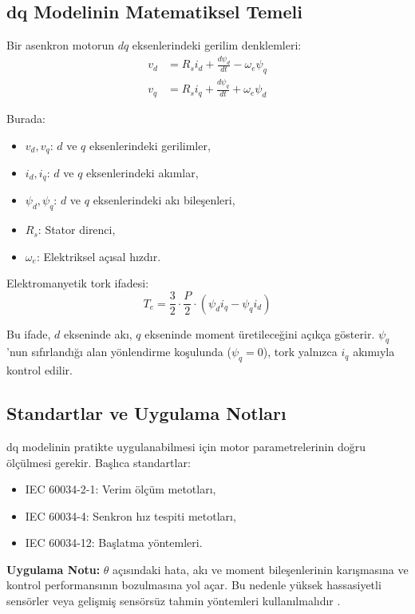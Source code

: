 \subsection{dq Modelinin Matematiksel Temeli}

Bir asenkron motorun $dq$ eksenlerindeki gerilim denklemleri:
\begin{align}
v_d &= R_s i_d + \frac{d\psi_d}{dt} - \omega_e \psi_q \\
v_q &= R_s i_q + \frac{d\psi_q}{dt} + \omega_e \psi_d
\end{align}

Burada:
\begin{itemize}
    \item $v_d, v_q$: $d$ ve $q$ eksenlerindeki gerilimler,
    \item $i_d, i_q$: $d$ ve $q$ eksenlerindeki akımlar,
    \item $\psi_d, \psi_q$: $d$ ve $q$ eksenlerindeki akı bileşenleri,
    \item $R_s$: Stator direnci,
    \item $\omega_e$: Elektriksel açısal hızdır.
\end{itemize}

Elektromanyetik tork ifadesi:
\begin{equation}
T_e = \frac{3}{2} \cdot \frac{P}{2} \cdot (\psi_d i_q - \psi_q i_d)
\end{equation}

Bu ifade, $d$ ekseninde akı, $q$ ekseninde moment üretileceğini açıkça gösterir. $\psi_q$’nun sıfırlandığı alan yönlendirme koşulunda ($\psi_q = 0$), tork yalnızca $i_q$ akımıyla kontrol edilir.

\subsection{Standartlar ve Uygulama Notları}
dq modelinin pratikte uygulanabilmesi için motor parametrelerinin doğru ölçülmesi gerekir. Başlıca standartlar:
\begin{itemize}
    \item IEC 60034-2-1: Verim ölçüm metotları,
    \item IEC 60034-4: Senkron hız tespiti metotları,
    \item IEC 60034-12: Başlatma yöntemleri.
\end{itemize}

\textbf{Uygulama Notu:} $\theta$ açısındaki hata, akı ve moment bileşenlerinin karışmasına ve kontrol performansının bozulmasına yol açar. Bu nedenle yüksek hassasiyetli sensörler veya gelişmiş sensörsüz tahmin yöntemleri kullanılmalıdır \cite{macdonald1979dq}.

